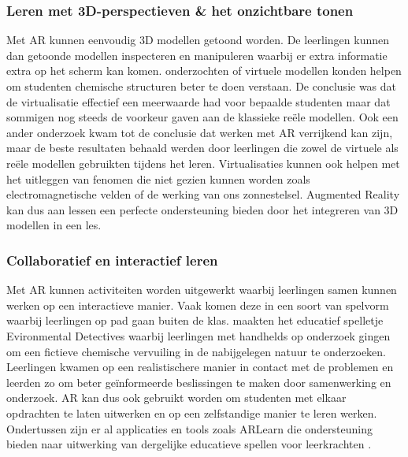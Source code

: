 \documentclass[pdftex,a4paper,12pt,twoside]{report}
\begin{document}
\subsubsection{Leren met 3D-perspectieven \& het onzichtbare tonen}
Met AR kunnen eenvoudig 3D modellen getoond worden. De leerlingen kunnen dan getoonde modellen inspecteren en manipuleren waarbij er extra informatie extra op het scherm kan komen. \cite{wu2001promoting} onderzochten of virtuele modellen konden helpen om studenten chemische structuren beter te doen verstaan. De conclusie was dat de virtualisatie effectief een meerwaarde had voor bepaalde studenten maar dat sommigen nog steeds de voorkeur gaven aan de klassieke re\"ele modellen. Ook een ander onderzoek \citep{chen2011use} kwam tot de conclusie dat werken met AR verrijkend kan zijn, maar de beste resultaten behaald werden door leerlingen die zowel de virtuele als re\"ele modellen gebruikten tijdens het leren. Virtualisaties kunnen ook helpen met het uitleggen van fenomen die niet gezien kunnen worden zoals electromagnetische velden of de werking van ons zonnestelsel. Augmented Reality kan dus aan lessen een perfecte ondersteuning bieden door het integreren van 3D modellen in een les.

\subsubsection{Collaboratief en interactief leren}
Met AR kunnen activiteiten worden uitgewerkt waarbij leerlingen samen kunnen werken op een interactieve manier. Vaak komen deze in een soort van spelvorm waarbij leerlingen op pad gaan buiten de klas. \cite{squire2007augmented} maakten het educatief spelletje Evironmental Detectives waarbij leerlingen met handhelds op onderzoek gingen om een fictieve chemische vervuiling in de nabijgelegen natuur te onderzoeken. Leerlingen kwamen op een realistischere manier in contact met de problemen en leerden zo om beter ge\"informeerde beslissingen te maken door samenwerking en onderzoek. AR kan dus ook gebruikt worden om studenten met elkaar opdrachten te laten uitwerken en op een zelfstandige manier te leren werken. Ondertussen zijn er al applicaties en tools zoals ARLearn die ondersteuning bieden naar uitwerking van dergelijke educatieve spellen voor leerkrachten \citep{arlearn}.

\end{document}
